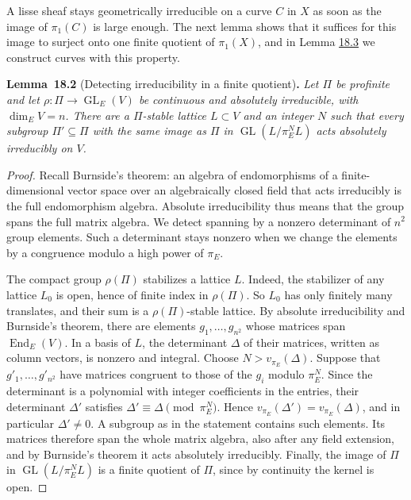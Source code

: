 \documentclass[11pt]{article}
\newenvironment{bpstatement}[2]{\par\addvspace{0.6\baselineskip}\noindent\textbf{#1}#2\textbf{.}\enspace\ignorespaces}
  {\par\addvspace{0.4\baselineskip}}
\newenvironment{bpstatementit}[2]{\begin{bpstatement}{#1}{#2}\itshape\ignorespaces}{\end{bpstatement}}
\providecommand{\GL}{}\renewcommand{\GL}{\operatorname{GL}}
\begin{document}
\label{bp277}%
A lisse sheaf stays geometrically irreducible on a curve \(C\) in \(X\) as soon as the image of \(\pi_1(C)\) is large enough. The next lemma shows that it suffices for this image to surject onto one finite quotient of \(\pi_1(X)\), and in Lemma \hyperref[bp281]{18.3} we construct curves with this property.

\label{bp278}%
\begin{bpstatementit}{Lemma~18.2}{ (Detecting irreducibility in a finite quotient)}
Let \(\Pi\) be profinite and let \(\rho:\Pi\to\GL_E(V)\) be continuous and absolutely irreducible, with \(\dim_E V=n\). There are a \(\Pi\)-stable lattice \(L\subset V\) and an integer \(N\) such that every subgroup \(\Pi'\subseteq\Pi\) with the same image as \(\Pi\) in \(\GL(L/\pi_E^NL)\) acts absolutely irreducibly on \(V\).
\end{bpstatementit}

\begin{proof}[{Proof}]\label{bp279}%
Recall Burnside's theorem: an algebra of endomorphisms of a finite-dimensional vector space over an algebraically closed field that acts irreducibly is the full endomorphism algebra. Absolute irreducibility thus means that the group spans the full matrix algebra. We detect spanning by a nonzero determinant of \(n^2\) group elements. Such a determinant stays nonzero when we change the elements by a congruence modulo a high power of \(\pi_E\).

The compact group \(\rho(\Pi)\) stabilizes a lattice \(L\). Indeed, the stabilizer of any lattice \(L_0\) is open, hence of finite index in \(\rho(\Pi)\). So \(L_0\) has only finitely many translates, and their sum is a \(\rho(\Pi)\)-stable lattice. By absolute irreducibility and Burnside's theorem, there are elements \(g_1,\ldots,g_{n^2}\) whose matrices span \(\operatorname{End}_E(V)\). In a basis of \(L\), the determinant \(\Delta\) of their matrices, written as column vectors, is nonzero and integral. Choose \(N>v_{\pi_E}(\Delta)\). Suppose that \(g'_1,\ldots,g'_{n^2}\) have matrices congruent to those of the \(g_i\) modulo \(\pi_E^N\). Since the determinant is a polynomial with integer coefficients in the entries, their determinant \(\Delta'\) satisfies \(\Delta'\equiv\Delta\pmod{\pi_E^N}\). Hence \(v_{\pi_E}(\Delta')=v_{\pi_E}(\Delta)\), and in particular \(\Delta'\ne0\). A subgroup as in the statement contains such elements. Its matrices therefore span the whole matrix algebra, also after any field extension, and by Burnside's theorem it acts absolutely irreducibly. Finally, the image of \(\Pi\) in \(\GL(L/\pi_E^NL)\) is a finite quotient of \(\Pi\), since by continuity the kernel is open.
\end{proof}
\end{document}
